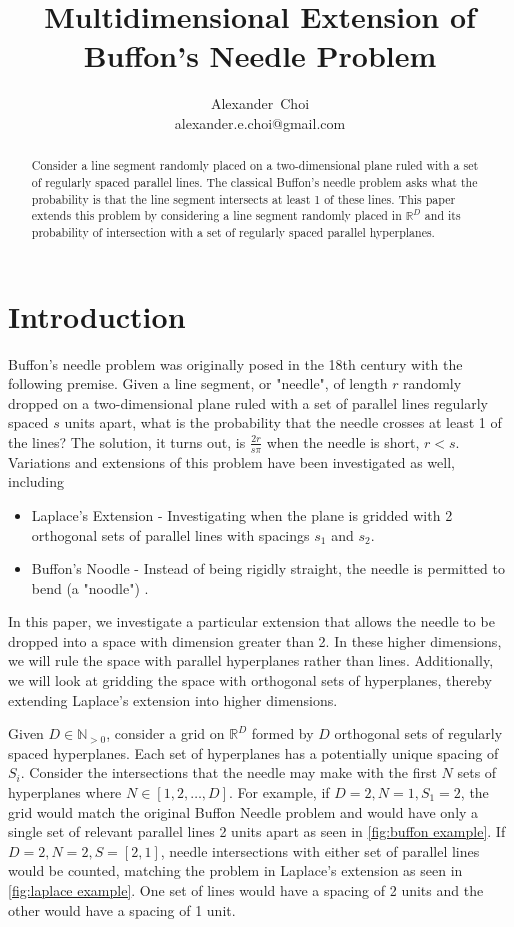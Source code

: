 \documentclass{article}
\title{Multidimensional Extension of Buffon's Needle Problem}
\author{ Alexander~Choi\\
	alexander.e.choi@gmail.com
}
\begin{document}
\maketitle

\begin{abstract}
	Consider a line segment randomly placed on a two-dimensional plane ruled with a set of regularly spaced parallel lines. The classical Buffon's needle problem
    asks what the probability is that the line segment intersects at least 1 of these lines. This paper extends this problem by considering a line segment randomly
    placed in $\mathbb{R}^D$ and its probability of intersection with a set of regularly spaced parallel hyperplanes. 
\end{abstract}



\section{Introduction}
Buffon's needle problem was originally posed in the 18th century with the following premise. Given a line segment, or "needle", of length $r$ randomly dropped on a two-dimensional plane
ruled with a set of parallel lines regularly spaced $s$ units apart, what is the probability that the needle crosses at least 1 of the lines? The solution, it turns out, is
$\frac{2r}{s\pi}$ when the needle is short, $r<s$. Variations and extensions of this problem have been investigated as well, including
\begin{itemize}
	\item Laplace's Extension - Investigating when the plane is gridded with 2 orthogonal sets of parallel lines with spacings $s_1$ and $s_2$.
	\item Buffon's Noodle - Instead of being rigidly straight, the needle is permitted to bend (a "noodle") \citep{buffon_noodle}.
\end{itemize}
In this paper, we investigate a particular extension that allows the needle to be dropped into a space with dimension greater than 2. In these higher dimensions, we will rule the space
with parallel hyperplanes rather than lines. Additionally, we will look at gridding the space with orthogonal sets of hyperplanes, thereby extending Laplace's extension into higher dimensions.

Given $D\in\mathbb{N}_{>0}$, consider a grid on $\mathbb{R}^D$ formed by $D$ orthogonal sets of regularly spaced hyperplanes. Each set of hyperplanes
has a potentially unique spacing of $S_i$. Consider the intersections that the needle may make
with the first $N$ sets of hyperplanes where $N\in[1,2,\dots,D]$. For example, if $D=2, N=1, S_1=2$, the
grid would match the original Buffon Needle problem and would have only a single set of relevant parallel lines 2
units apart as seen in \ref{fig:buffon example}. If $D=2, N=2, S=[2, 1]$, needle intersections with either
set of parallel lines would be counted, matching the problem in Laplace's extension as seen in 
\ref{fig:laplace example}. One set of lines would have a spacing of 2 units and the other would have a 
spacing of 1 unit.
\end{document}
